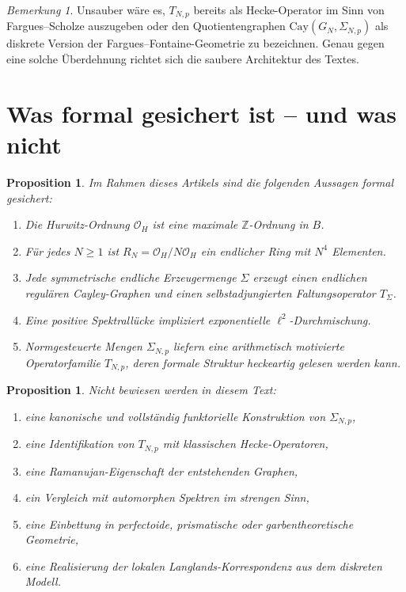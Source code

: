 \documentclass[12pt,a4paper]{article}
\theoremstyle{plain}
\newtheorem{proposition}[satz]{Proposition}
\theoremstyle{definition}
\theoremstyle{remark}
\newtheorem{bemerkung}[satz]{Bemerkung}
\newcommand{\Z}{\mathbb{Z}}
\newcommand{\OH}{\mathcal{O}_H}
\begin{document}
	\begin{bemerkung}
		Unsauber wäre es, \(T_{N,p}\) bereits als Hecke-Operator
		im Sinn von Fargues--Scholze auszugeben oder
		den Quotientengraphen \(\mathrm{Cay}(G_N,\Sigma_{N,p})\)
		als diskrete Version der Fargues--Fontaine-Geometrie zu bezeichnen.
		Genau gegen eine solche Überdehnung richtet sich die saubere Architektur des Textes.
	\end{bemerkung}
	
	\section{Was formal gesichert ist -- und was nicht}
	
	\begin{proposition}
		Im Rahmen dieses Artikels sind die folgenden Aussagen formal gesichert:
		\begin{enumerate}[label=\arabic*.]
			\item Die Hurwitz-Ordnung \(\OH\) ist eine maximale \(\Z\)-Ordnung in \(B\).
			\item Für jedes \(N\ge 1\) ist \(R_N=\OH/N\OH\) ein endlicher Ring mit \(N^4\) Elementen.
			\item Jede symmetrische endliche Erzeugermenge \(\Sigma\) erzeugt einen endlichen
			regulären Cayley-Graphen und einen selbstadjungierten Faltungsoperator \(T_\Sigma\).
			\item Eine positive Spektrallücke impliziert exponentielle \(\ell^2\)-Durchmischung.
			\item Normgesteuerte Mengen \(\Sigma_{N,p}\) liefern eine arithmetisch motivierte
			Operatorfamilie \(T_{N,p}\), deren formale Struktur heckeartig gelesen werden kann.
		\end{enumerate}
	\end{proposition}
	
	\begin{proposition}
		Nicht bewiesen werden in diesem Text:
		\begin{enumerate}[label=\arabic*.]
			\item eine kanonische und vollständig funktorielle Konstruktion von \(\Sigma_{N,p}\),
			\item eine Identifikation von \(T_{N,p}\) mit klassischen Hecke-Operatoren,
			\item eine Ramanujan-Eigenschaft der entstehenden Graphen,
			\item ein Vergleich mit automorphen Spektren im strengen Sinn,
			\item eine Einbettung in perfectoide, prismatische oder garbentheoretische Geometrie,
			\item eine Realisierung der lokalen Langlands-Korrespondenz aus dem diskreten Modell.
		\end{enumerate}
	\end{proposition}
	
\end{document}
